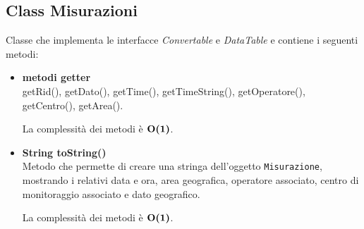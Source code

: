 \documentclass[a4paper, 12pt]{scrreprt}
\begin{document}
			\subsection{Class Misurazioni}
			Classe che implementa le interfacce \textsl{Convertable} e \textsl{DataTable} e contiene i seguenti metodi:\\
			\begin{itemize}
				\item \textbf{metodi getter}
				\\getRid(), getDato(), getTime(), getTimeString(), getOperatore(), getCentro(), getArea().

				La complessit\`a dei metodi \`e $\mathbf{O}\textbf{(1)}$.

				\item \textbf{String toString()}
				\\Metodo che permette di creare una stringa dell'oggetto \verb!Misurazione!, mostrando i relativi data e ora, area geografica, operatore associato, centro di monitoraggio associato e dato geografico.

				La complessit\`a dei metodi \`e $\mathbf{O}\textbf{(1)}$.

			\end{itemize}
\pagebreak
\end{document}
